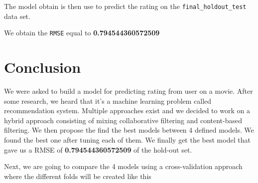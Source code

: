 \documentclass[
]{article}
\newenvironment{Shaded}{\begin{snugshade}}{\end{snugshade}}
\newcommand{\AttributeTok}[1]{\textcolor[rgb]{0.13,0.29,0.53}{#1}}
\newcommand{\FunctionTok}[1]{\textcolor[rgb]{0.13,0.29,0.53}{\textbf{#1}}}
\newcommand{\NormalTok}[1]{#1}
\newcommand{\OtherTok}[1]{\textcolor[rgb]{0.56,0.35,0.01}{#1}}
\newcommand{\SpecialCharTok}[1]{\textcolor[rgb]{0.81,0.36,0.00}{\textbf{#1}}}
\begin{document}
The model obtain is then use to predict the rating on the
\texttt{final\_holdout\_test} data set.

\begin{Shaded}
\end{Shaded}

We obtain the \texttt{RMSE} equal to \textbf{0.794544360572509}

\section{Conclusion}\label{conclusion}

We were asked to build a model for predicting rating from user on a
movie. After some research, we heard that it's a machine learning
problem called recommendation system. Multiple approaches exist and we
decided to work on a hybrid approach consisting of mixing collaborative
filtering and content-based filtering. We then propose the find the best
models between 4 defined models. We found the best one after tuning each
of them. We finally get the best model that gave us a RMSE of
\textbf{0.794544360572509} of the hold-out set.

Next, we are going to compare the 4 models using a cross-validation
approach where the different folds will be created like this
\end{document}
